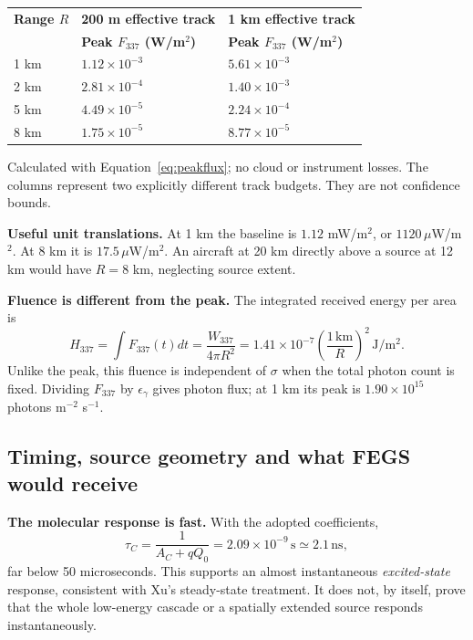 \documentclass[11pt,a4paper]{article}
\newcommand{\xu}[1]{\cite[#1]{Xu2015}}
\newcommand{\source}[1]{{\small\color{muted}#1}\par}
\begin{document}
\begin{center}
\small
\begin{tabularx}{\textwidth}{@{}P{25mm}Y Y@{}}
\toprule
\textbf{Range $R$} & \textbf{200 m effective track} & \textbf{1 km effective track}\\
 & \textbf{Peak $F_{337}$ (W/m$^2$)} & \textbf{Peak $F_{337}$ (W/m$^2$)}\\
 km & $1.12\times10^{-3}$ & $5.61\times10^{-3}$\\
2 km & $2.81\times10^{-4}$ & $1.40\times10^{-3}$\\
5 km & $4.49\times10^{-5}$ & $2.24\times10^{-4}$\\
8 km & $1.75\times10^{-5}$ & $8.77\times10^{-5}$\\
\bottomrule
\end{tabularx}
\end{center}
\source{Calculated with Equation~\eqref{eq:peakflux}; no cloud or instrument losses. The columns represent two explicitly different track budgets. They are not confidence bounds.}

\textbf{Useful unit translations.} At 1 km the baseline is $1.12$ mW/m$^2$, or $1120\,\mu$W/m$^2$. At 8 km it is $17.5\,\mu$W/m$^2$. An aircraft at 20 km directly above a source at 12 km would have $R=8$ km, neglecting source extent.

\textbf{Fluence is different from the peak.} The integrated received energy per area is
\[
 H_{337}=\int F_{337}(t)dt=\frac{W_{337}}{4\pi R^2}
 =1.41\times10^{-7}\left(\frac{1\,\mathrm{km}}{R}\right)^2\,\mathrm{J/m^2}.
\]
Unlike the peak, this fluence is independent of $\sigma$ when the total photon count is fixed. Dividing $F_{337}$ by $\epsilon_\gamma$ gives photon flux; at 1 km its peak is $1.90\times10^{15}$ photons m$^{-2}$ s$^{-1}$.

\clearpage
\subsection{Timing, source geometry and what FEGS would receive}
\label{sec:peakconditions}
\textbf{The molecular response is fast.} With the adopted coefficients,
\[
 \tau_C=\frac{1}{A_C+qQ_0}=2.09\times10^{-9}\,\mathrm s\simeq2.1\,\mathrm{ns},
\]
far below 50 microseconds. This supports an almost instantaneous \emph{excited-state} response, consistent with Xu's steady-state treatment. It does not, by itself, prove that the whole low-energy cascade or a spatially extended source responds instantaneously.\xu{Sec.~2.2}
\end{document}
